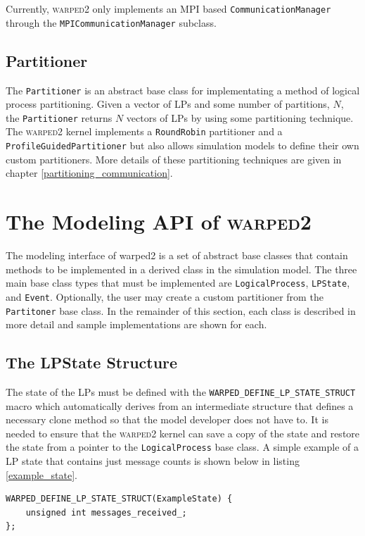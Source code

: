\documentclass[11pt]{book}
\begin{document}
Currently, \textsc{warped2} only implements an MPI based \texttt{CommunicationManager} through
the \texttt{MPICommunicationManager} subclass.

\subsection{Partitioner}

The \texttt{Partitioner} is an abstract base class for implementating a method of logical
process partitioning.  Given a vector of LPs and some number of partitions, $N$, the \texttt{Partitioner}
returns $N$ vectors of LPs by using some partitioning technique.  The \textsc{warped2} kernel
implements a \texttt{RoundRobin} partitioner and a \texttt{ProfileGuidedPartitioner} but also
allows simulation models to define their own custom partitioners.  More details of these
partitioning techniques are given in chapter \ref{partitioning_communication}.

\section{The Modeling API of \textsc{warped2}}

The modeling interface of warped2 is a set of abstract base classes that contain methods
to be implemented in a derived class in the simulation model.  The three main base class
types that must be implemented are \texttt{LogicalProcess}, \texttt{LPState}, and \texttt{Event}.
Optionally, the user may create a custom partitioner from the \texttt{Partitoner} base class.
In the remainder of this section, each class is described in more detail and sample implementations
are shown for each.

\subsection{The LPState Structure}

The state of the LPs must be defined with the \texttt{WARPED\_DEFINE\_LP\_STATE\_STRUCT}
macro which automatically derives from an intermediate structure that defines a necessary
clone method so that the model developer does not have to.  It is needed to ensure that the \textsc{warped2}
kernel can save a copy of the state and restore the state from a pointer to the \texttt{LogicalProcess}
base class.  A simple example of a LP state that contains just message counts is shown below in
listing \ref{example_state}.

\begin{lstlisting}[caption=Example \textsc{warped2} State Definition, label=example_state, float]
WARPED_DEFINE_LP_STATE_STRUCT(ExampleState) {
    unsigned int messages_received_;
};
\end{lstlisting}
\end{document}
